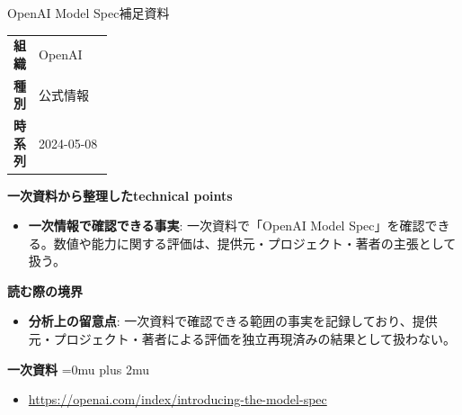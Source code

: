 \begin{technicalnote}{OpenAI Model Spec}{補足資料}
\begingroup
\begin{tabularx}{\linewidth}{@{}>{\bfseries}p{0.22\linewidth}X@{}}
組織 & OpenAI \\
種別 & 公式情報 \\
時系列 & 2024-05-08 \\
\end{tabularx}
\smallskip
{\bfseries 一次資料から整理したtechnical points}
\begin{itemize}[leftmargin=1.5em,itemsep=0.35em]
\item \textbf{一次情報で確認できる事実}: 一次資料で「OpenAI Model Spec」を確認できる。数値や能力に関する評価は、提供元・プロジェクト・著者の主張として扱う。
\end{itemize}
\begin{minipage}{\linewidth}
{\bfseries 読む際の境界}
\begin{itemize}[leftmargin=1.5em,itemsep=0.35em]
\item \textbf{分析上の留意点}: 一次資料で確認できる範囲の事実を記録しており、提供元・プロジェクト・著者による評価を独立再現済みの結果として扱わない。
\end{itemize}
\begin{samepage}
{\bfseries 一次資料}
\begingroup\sloppy
\Urlmuskip=0mu plus 2mu\relax
\begin{itemize}[leftmargin=1.5em,itemsep=0.25em]
\item {\scriptsize\url{https://openai.com/index/introducing-the-model-spec}}
\end{itemize}
\endgroup
\end{samepage}
\end{minipage}
\endgroup
\end{technicalnote}
\medskip

